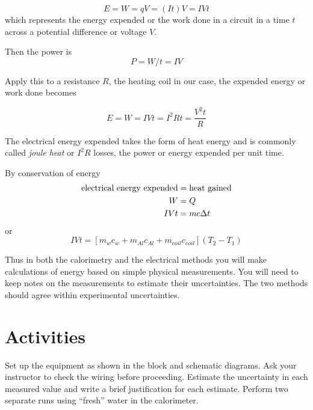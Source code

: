 \begin{multicols}{2}
\begin{equation}\label{e:iheat} E = W = qV = (It)V = IVt\end{equation}
which represents the energy expended or the work done in a circuit in a time  $t$ across a potential difference or voltage $V$.	


Then the power is 
\begin{equation}\label{e:power} P = W/t = IV \end{equation}

Apply this to a resistance $R$, the heating coil in our case, the expended energy or work done becomes

\begin{equation}\label{e:eWork} 
E = W = IVt = I^2Rt = \frac{V^2t}{R} 
\end{equation}

The electrical energy expended takes the form of heat energy and is commonly called \textsl{joule heat} or \textsl{$I^2 R$} losses, the power or energy expended per unit time.

By conservation of energy
\begin{align} 
\text{electrical energy expended} & = \text{heat gained} \notag \\
W & = Q \notag \\
IVt & = mc\Delta t \notag
\end{align}
or
\begin{equation}
IVt = [m_wc_w + m_{Al}c_{Al} + m_{coil}c_{coil}](T_2 - T_1)
\end{equation}

Thus in both the calorimetry and the electrical methods you will make calculations of energy based on simple physical measurements.  You will need to keep notes on the measurements to estimate their uncertainties.  The two methods should agree within experimental uncertainties.

\section{Activities}
Set up the equipment as shown in the block and schematic diagrams.  Ask your instructor to check the wiring before proceeding.  Estimate the uncertainty in each measured value and write a brief justification for each estimate. Perform two separate runs using ``fresh'' water in the calorimeter.


\end{multicols}
